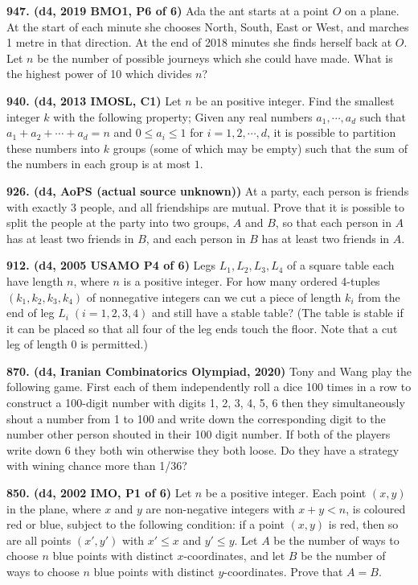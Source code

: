 \documentclass{article}
\begin{document}
        \textbf{947. (\color{red}d4\color{black}, 2019 BMO1, P6 of 6)} Ada the ant starts at a point $O$ on a plane. At the start of each minute she chooses North, South, East or West, and marches 1 metre in that direction. At the end of 2018 minutes she finds herself back at $O$. Let $n$ be the number of possible journeys which she could have made. What is the highest power of 10 which divides $n$?

        \textbf{940. (\color{red}d4\color{black}, 2013 IMOSL, C1)} Let $n$ be an positive integer. Find the smallest integer $k$ with the following property; Given any real numbers $a_1 , \cdots , a_d $ such that $a_1 + a_2 + \cdots + a_d = n$ and $0 \le a_i \le 1$ for $i=1,2,\cdots ,d$, it is possible to partition these numbers into $k$ groups (some of which may be empty) such that the sum of the numbers in each group is at most $1$.

        \textbf{926. (\color{red}d4\color{black}, AoPS (actual source unknown))} At a party, each person is friends with exactly \(3\) people, and all friendships are mutual. Prove that it is possible to split the people at the party into two groups, \(A\) and \(B\), so that each person in \(A\) has at least two friends in \(B\), and each person in \(B\) has at least two friends in \(A\).

        \textbf{912. (\color{red}d4\color{black}, 2005 USAMO P4 of 6)} Legs $L_1, L_2, L_3, L_4$ of a square table each have length $n$, where $n$ is a positive integer. For how many ordered 4-tuples $(k_1, k_2, k_3, k_4)$ of nonnegative integers can we cut a piece of length $k_i$ from the end of leg $L_i \; (i = 1,2,3,4)$ and still have a stable table? (The table is stable if it can be placed so that all four of the leg ends touch the floor. Note that a cut leg of length 0 is permitted.)

        \textbf{870. (\color{red}d4\color{black}, Iranian Combinatorics Olympiad, 2020)} Tony and Wang play the following game. First each of them independently roll a dice 100 times in a row to construct a 100-digit number with digits 1, 2, 3, 4, 5, 6 then they simultaneously shout a number from 1 to 100 and write down the corresponding digit to the number other person shouted in their 100 digit number. If both of the players write down 6 they both win otherwise they both loose. Do they have a strategy with wining chance more than 1/36?

        \textbf{850. (\color{red}d4\color{black}, 2002 IMO, P1 of 6)} Let $n$ be a positive integer. Each point $(x,y)$ in the plane, where $x$ and $y$ are non-negative integers with $x+y<n$, is coloured red or blue, subject to the following condition: if a point $(x,y)$ is red, then so are all points $(x',y')$ with $x'\leq x$ and $y'\leq y$. Let $A$ be the number of ways to choose $n$ blue points with distinct $x$-coordinates, and let $B$ be the number of ways to choose $n$ blue points with distinct $y$-coordinates. Prove that $A=B$.
\end{document}
